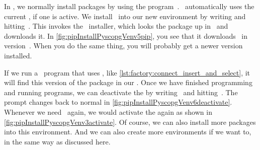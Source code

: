 In \python, we normally install packages by using the program~\pip.
\pip~automatically uses the current , if one is active.
We install \psycopg\ into our new environment by writing  and hitting~\keys{\enter}.
This invokes the \pip\ installer, which looks the package up in \pypi\ and downloads it.
In \cref{fig:pipInstallPyscopgVenv5pip}, you see that it downloads \psycopg\ in version~.
When you do the same thing, you will probably get a newer version installed.

If we run a \python\ program that uses \psycopg, like \cref{lst:factory:connect_insert_and_select}, it will find this version of the package in our .
Once we have finished programming and running programs, we can deactivate the  by writing~ and hitting~\keys{\enter}.
The prompt changes back to normal in \cref{fig:pipInstallPyscopgVenv6deactivate}.
Whenever we need \psycopg\ again, we would activate the  again as shown in \cref{fig:pipInstallPyscopgVenv3activate}.
Of course, we can also install more packages into this environment.
And we can also create more environments if we want to, in the same way as discussed here.%
\FloatBarrier%
\endhsection%
%
%
\label{sec:cloningExamplesRepoAndInstallingPsycopgUnderPyCharm}%
%
